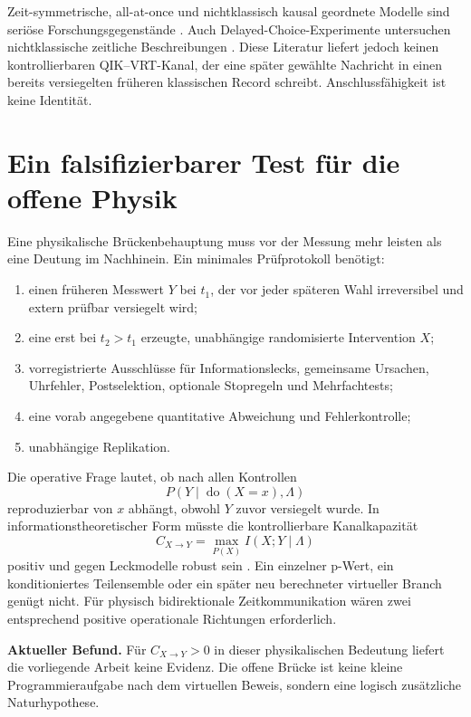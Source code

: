 \documentclass[11pt,a4paper]{article}
\theoremstyle{remark}
\newcommand{\statusbox}[2]{%
  \par\medskip\noindent
  \colorbox{#1}{\parbox{\dimexpr\linewidth-2\fboxsep\relax}{#2}}%
  \par\medskip
}
\begin{document}
Zeit-symmetrische, all-at-once und nichtklassisch kausal geordnete Modelle
sind seriöse Forschungsgegenstände \cite{wharton,ocb}. Auch
Delayed-Choice-Experimente untersuchen nichtklassische zeitliche
Beschreibungen \cite{ma}. Diese Literatur liefert jedoch keinen
kontrollierbaren QIK--VRT-Kanal, der eine später gewählte Nachricht in einen
bereits versiegelten früheren klassischen Record schreibt. Anschlussfähigkeit
ist keine Identität.

\section{Ein falsifizierbarer Test für die offene Physik}

Eine physikalische Brückenbehauptung muss vor der Messung mehr leisten als
eine Deutung im Nachhinein. Ein minimales Prüfprotokoll benötigt:

\begin{enumerate}
  \item einen früheren Messwert \(Y\) bei \(t_1\), der vor jeder späteren
        Wahl irreversibel und extern prüfbar versiegelt wird;
  \item eine erst bei \(t_2>t_1\) erzeugte, unabhängige randomisierte
        Intervention \(X\);
  \item vorregistrierte Ausschlüsse für Informationslecks, gemeinsame
        Ursachen, Uhrfehler, Postselektion, optionale Stopregeln und
        Mehrfachtests;
  \item eine vorab angegebene quantitative Abweichung und Fehlerkontrolle;
  \item unabhängige Replikation.
\end{enumerate}

Die operative Frage lautet, ob nach allen Kontrollen
\[
 P(Y\mid\operatorname{do}(X=x),\Lambda)
\]
reproduzierbar von \(x\) abhängt, obwohl \(Y\) zuvor versiegelt wurde. In
informationstheoretischer Form müsste die kontrollierbare Kanalkapazität
\[
 C_{X\rightarrow Y}=\max_{P(X)} I(X;Y\mid\Lambda)
\]
positiv und gegen Leckmodelle robust sein \cite{shannon,pearl}. Ein einzelner
p-Wert, ein konditioniertes Teilensemble oder ein später neu berechneter
virtueller Branch genügt nicht. Für physisch bidirektionale Zeitkommunikation
wären zwei entsprechend positive operationale Richtungen erforderlich.

\statusbox{QRed}{
\textbf{Aktueller Befund.}
Für \(C_{X\rightarrow Y}>0\) in dieser physikalischen Bedeutung liefert die
vorliegende Arbeit keine Evidenz. Die offene Brücke ist keine kleine
Programmieraufgabe nach dem virtuellen Beweis, sondern eine logisch
zusätzliche Naturhypothese.
}
\end{document}
